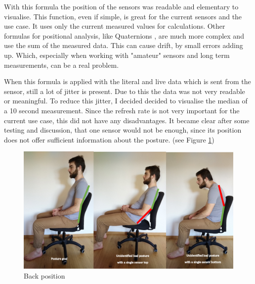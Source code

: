 With this formula the position of the sensors was readable and elementary to visualise. This function, even if simple, is great for the current sensors and the use case. It uses only the current measured values for calculations. Other formulas for positional analysis, like Quaternions \cite{MathsQua11}, are much more complex and use the sum of the measured data. This can cause drift, by small errors adding up. Which, especially when working with "amateur" sensors and long term measurements, can be a real problem.

When this formula is applied with the literal and live data which is sent from the sensor, still a lot of jitter is present. Due to this the data was not very readable or meaningful. To reduce this jitter, I decided decided to visualise the median of a 10 second measurement. Since the refresh rate is not very important for the current use case, this did not have any disadvantages. It became clear after some testing and discussion, that one sensor would not be enough, since its position does not offer sufficient information about the posture. (see Figure \ref{fig:BackPos})

\begin{figure}[h]
  \begin{center}
\includegraphics[width=\textwidth]{images/Backposition.png}
  \end{center}
  \caption{Back position}
  \label{fig:BackPos}
\end{figure}

